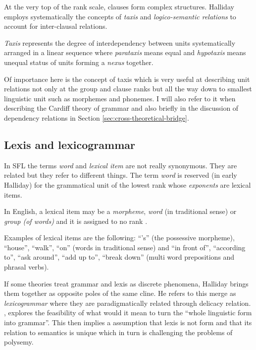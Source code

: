 At the very top of the rank scale, clauses form complex structures. Halliday employs systematically the concepts of \textit{taxis} and \textit{logico-semantic relations} to account for inter-clausal relations. 

\begin{definition}[Taxis]\label{def:taxis}
    \textit{Taxis} represents the degree of interdependency between units systematically arranged in a linear sequence where \textit{parataxis} means equal and \textit{hypotaxis} means unequal status of units forming a \textit{nexus} together.
\end{definition}

Of importance here is the concept of taxis which is very useful at describing unit relations not only at the group and clause ranks but all the way down to smallest linguistic unit such as morphemes and phonemes. I will also refer to it when describing the Cardiff theory of grammar and also briefly in the discussion of dependency relations in Section \ref{sec:cross-theoretical-bridge}. 

\subsection{Lexis and lexicogrammar}
In SFL the terms \textit{word} and \textit{lexical item} are not really synonymous. They are related but they refer to different things. The term \textit{word} is reserved (in early Halliday) for the grammatical unit of the lowest rank whose \textit{exponents} are lexical items. %

\begin{definition}\label{def:lexical-item}
	In English, a lexical item may be a \textit{morpheme}, \textit{word} (in traditional sense) or \textit{group (of words)} and it is assigned to no rank \citep[60]{Halliday2002}.
\end{definition}

Examples of lexical items are the following: ``'s'' (the possessive morpheme), ``house'', ``walk'', ``on'' (words in traditional sense) and ``in front of'', ``according to'', ``ask around'', ``add up to'', ``break down'' (multi word prepositions and phrasal verbs).

If some theories treat grammar and lexis as discrete phenomena, Halliday brings them together as opposite poles of the same cline. He refers to this merge as \textit{lexicogrammar} where they are paradigmatically related through delicacy relation.
\citet{Hasan2014}, explores the feasibility of what would it mean to turn the ``whole linguistic form into grammar''. This then implies a assumption that lexis is not form and that its relation to semantics is unique which  in turn is challenging the problems of polysemy. 


